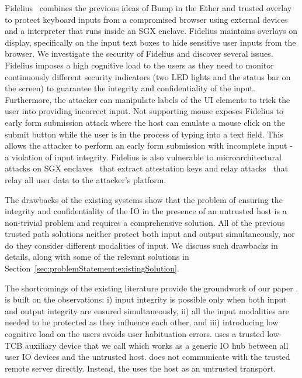 Fidelius~\cite{Fidelius} combines the previous ideas of Bump in the Ether and trusted overlay to protect keyboard inputs from a compromised browser using external devices and a \js interpreter that runs inside an SGX enclave. Fidelius maintains overlays on display, specifically on the input text boxes to hide sensitive user inputs from the browser. We investigate the security of Fidelius and discover several issues. Fidelius imposes a high cognitive load to the users as they need to monitor continuously different security indicators (two LED lights and the status bar on the screen) to guarantee the integrity and confidentiality of the input. Furthermore, the attacker can manipulate labels of the UI elements to trick the user into providing incorrect input. Not supporting mouse  exposes Fidelius to early form submission attack where the host can emulate a mouse click on the submit button while the user is in the process of typing into a text field. This allows the attacker to perform an early form submission with incomplete input - a violation of input integrity. Fidelius is also vulnerable to microarchitectural attacks on SGX enclaves~\cite{van2018foreshadow} that extract attestation keys and relay attacks~\cite{dhar2018proximitee} that relay all user data to the attacker's platform. 

The drawbacks of the existing systems show that the problem of ensuring the integrity and confidentiality of the IO in the presence of an untrusted host is a non-trivial problem and requires a comprehensive solution. All of the previous trusted path solutions neither protect both input and output simultaneously, nor do they consider different modalities of input. We discuss such drawbacks in details, along with some of the relevant solutions in Section~\ref{sec:problemStatement:existingSolution}.

 
 The shortcomings of the existing literature provide the groundwork of our paper \name. %
\name is built on the observations: i) input integrity is possible only when both input and output integrity are ensured simultaneously, ii) all the input modalities are needed to be protected as they influence each other, and iii) introducing low cognitive load on the users avoids user habituation errors. \name uses a trusted low-TCB auxiliary device that we call \device which works as a generic IO hub between all user IO devices and the untrusted host. \device does not communicate with the trusted remote server directly. Instead, the \device uses the host as an untrusted transport.

